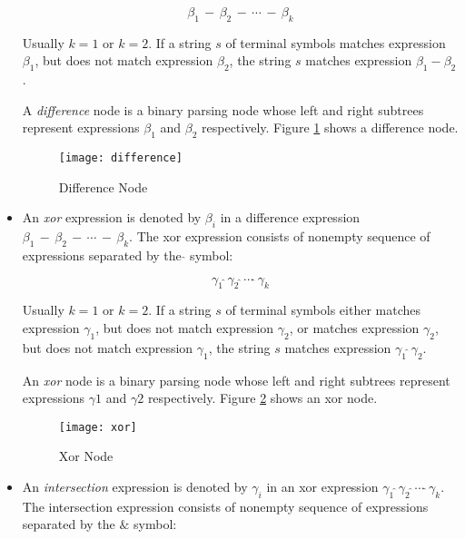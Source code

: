 \documentclass[a4paper,oneside,11pt]{book}
\theoremstyle{definition}
\begin{document}
\begin{itemize}
$$\beta_1 \,-\, \beta_2 \,-\, \cdots \,-\, \beta_k$$

Usually $k=1$ or $k=2$.
If a string $s$ of terminal symbols matches expression $\beta_1$, but does not match expression $\beta_2$,
the string $s$ matches expression $\beta_1 - \beta_2$.

A \emph{difference} node is a binary parsing node whose left and right subtrees represent expressions $\beta_1$ and $\beta_2$ respectively.
Figure \ref{fig:difference} shows a difference node.

\begin{figure}[htb]
\caption{Difference Node}
\label{fig:difference}
\vspace{0.5cm}
\begin{center}
\texttt{[image: difference]}
\end{center}
\end{figure}

\item
An \emph{xor} expression is denoted by $\beta_i$ in a difference expression $\beta_1 \,-\, \beta_2 \,-\, \cdots \,-\, \beta_k$.
The xor expression consists of nonempty sequence of expressions separated by the $\hat{}$ symbol:

$$\gamma_1 \, \hat{} \, \gamma_2\, \hat{} \, \cdots \, \hat{} \, \gamma_k$$

Usually $k=1$ or $k=2$.
If a string $s$ of terminal symbols either matches expression $\gamma_1$, but does not match expression $\gamma_2$,
or matches expression $\gamma_2$, but does not match expression $\gamma_1$, the string $s$ matches expression $\gamma_1\, \hat{}\, \gamma_2$.

An \emph{xor} node is a binary parsing node whose left and right subtrees represent expressions $\gamma1$ and $\gamma2$ respectively.
Figure \ref{fig:xor} shows an xor node.

\begin{figure}[htb]
\caption{Xor Node}
\label{fig:xor}
\vspace{0.5cm}
\begin{center}
\texttt{[image: xor]}
\end{center}
\end{figure}

\item
An \emph{intersection} expression is denoted by $\gamma_i$ in an xor expression $\gamma_1 \, \hat{} \, \gamma_2\, \hat{} \, \cdots \, \hat{} \, \gamma_k$.
The intersection expression consists of nonempty sequence of expressions separated by the $\&$ symbol:


\end{itemize}
\end{document}
